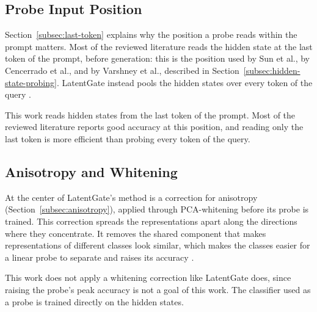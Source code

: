 \subsection{Probe Input Position}
\label{subsec:probe-position-requirements}

Section~\ref{subsec:last-token} explains why the position a probe reads within the prompt matters. Most of the reviewed literature reads the hidden state at the last token of the prompt, before generation: this is the position used by Sun et al., by Cencerrado et al., and by Varshney et al., described in Section~\ref{subsec:hidden-state-probing}. LatentGate instead pools the hidden states over every token of the query \cite{ratnakarLatentGateLowLatencySemantic2026}.

This work reads hidden states from the last token of the prompt. Most of the reviewed literature reports good accuracy at this position, and reading only the last token is more efficient than probing every token of the query.

\subsection{Anisotropy and Whitening}
\label{subsec:anisotropy-scope}

At the center of LatentGate's method is a correction for anisotropy (Section~\ref{subsec:anisotropy}), applied through PCA-whitening before its probe is trained. This correction spreads the representations apart along the directions where they concentrate. It removes the shared component that makes representations of different classes look similar, which makes the classes easier for a linear probe to separate and raises its accuracy \cite{ratnakarLatentGateLowLatencySemantic2026}.

This work does not apply a whitening correction like LatentGate does, since raising the probe's peak accuracy is not a goal of this work. The classifier used as a probe is trained directly on the hidden states.
